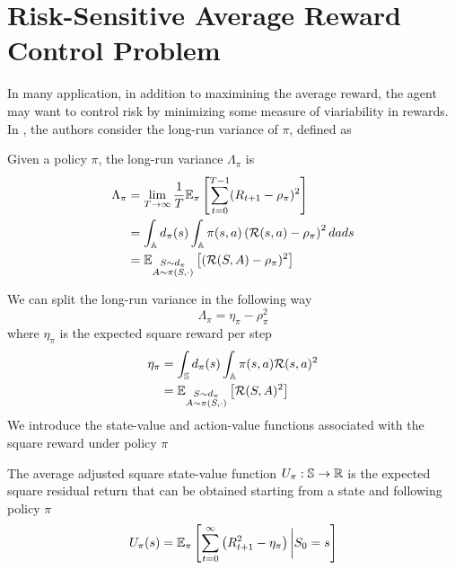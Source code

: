 \documentclass[a4paper,11pt]{article}
\begin{document}
\section{Risk-Sensitive Average Reward Control Problem}
In many application, in addition to maximining the average reward, the agent
may want to control risk by minimizing some measure of viariability in rewards.
In \cite{prashanth2014actor}, the authors consider the long-run variance of
$\pi$, defined as 
\begin{definition}
	Given a policy $\pi$, the long-run variance $\Lambda_\pi$ is 
	\begin{equation}
		\begin{split}
			\Lambda_\pi &= \lim_{T \to \infty} \frac{1}{T} \E[\pi]{
			\sum^{T-1}_{t=0} (R_{t+1} - \rho_\pi)^2}\\
			&= \int_\A d_\pi(s) \int_\A \pi(s,a) \left(\calR(s,a) - \rho_\pi
			\right)^2 da ds\\
			&= \E[\substack{S\sim d_\pi \\ A \sim \pi(S, \cdot)}]{(\calR(S,A) -
				\rho_\pi)^2}
		\end{split}
	\end{equation}
\end{definition}
We can split the long-run variance in the following way
\begin{equation}
	\Lambda_\pi = \eta_\pi - \rho_\pi^2 
\end{equation}
where $\eta_\pi$ is the expected square reward per step  
\begin{equation}
	\begin{split}
		\eta_\pi &= \int_\S d_\pi(s) \int_\A \pi(s,a) \calR(s,a)^2\\
				 &= \E[\substack{S\sim d_\pi \\ A \sim \pi(S, \cdot)}]{\calR(S,A)^2}	
	\end{split}
\end{equation}
We introduce the state-value and action-value functions associated with the
square reward under policy $\pi$
\begin{definition}
	The average adjusted square state-value function $U_\pi : \S \to \R$ is the
	expected square residual return that can be obtained starting from a state 
	and following policy $\pi$
	\begin{equation}
		U_\pi(s) = \E[\pi]{\sum^{\infty}_{t=0} \left(R_{t+1}^2 - \eta_\pi\right)
		\bigg| S_0 = s}
	\end{equation}
\end{definition}
\end{document}
